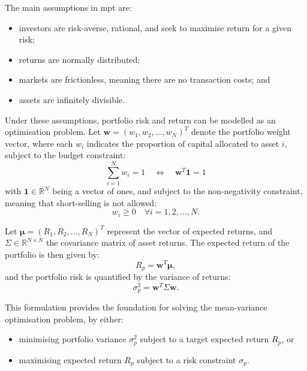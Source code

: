 The main assumptions in \acrshort{mpt} are:
\begin{itemize}
    \item investors are risk-averse, rational, and seek to maximise return for a given risk;
	\item returns are normally distributed;
	\item markets are frictionless, meaning there are no transaction costs; and
	\item assets are infinitely divisible.
\end{itemize}

Under these assumptions, portfolio risk and return can be modelled as an optimisation problem. Let $\mathbf{w} = \left(w_1, w_2, \dots, w_N\right)^T$ denote the portfolio weight vector, where each $w_i$ indicates the proportion of capital allocated to asset $i$, subject to the budget constraint:
\begin{equation}
    \sum_{i=1}^{N} w_i = 1 \quad \Leftrightarrow \quad \mathbf{w}^T \mathbf{1} = 1
\end{equation}
with $\mathbf{1} \in \mathbb{R}^N$ being a vector of ones, and subject to the non-negativity constraint, meaning that short-selling is not allowed:
\begin{equation}
    w_i \geq 0 \quad \forall i = 1, 2, \dots, N.
\end{equation}

Let $\boldsymbol{\mu} = \left(R_1, R_2, \dots, R_N\right)^T$ represent the vector of expected returns, and $\Sigma \in \mathbb{R}^{N \times N}$ the covariance matrix of asset returns. The expected return of the portfolio is then given by:
\begin{equation}
    R_p = \mathbf{w}^T \boldsymbol{\mu},
\end{equation}
and the portfolio risk is quantified by the variance of returns:
\begin{equation}
    \sigma_p^2 = \mathbf{w}^T \Sigma \mathbf{w}.
\end{equation}

This formulation provides the foundation for solving the mean-variance optimisation problem, by either:
\begin{itemize}
    \item minimising portfolio variance $\sigma_p^2$ subject to a target expected return $R_p$, or
    \item maximising expected return $R_p$ subject to a risk constraint $\sigma_p$.
\end{itemize}

